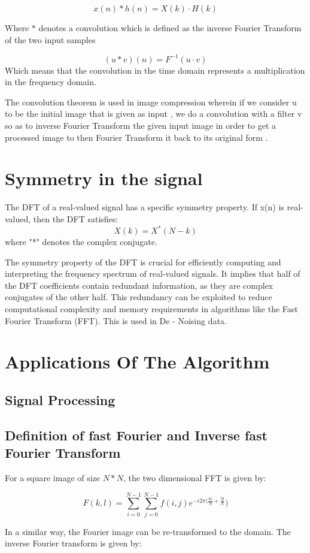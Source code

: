 \documentclass[11pt]{amsart}
\theoremstyle{definition}
\theoremstyle{remark}
\numberwithin{equation}{section}
\begin{document}
\[x(n) \ast h(n)  = X(k) \cdot H(k)\]

Where $\ast$ denotes a convolution which is defined as the inverse Fourier Transform of the two input samples 

\[(u \ast v)(n) = \textit{F}^{-1} (u \cdot v)\]
Which means that the convolution in the time domain represents a multiplication in the frequency domain.

The convolution theorem is used in image compression wherein if we consider u to be the initial image that is given as input , we do a convolution with a filter v so as to inverse Fourier Transform the given input image in order to get a processed image to then Fourier Transform it back to its original form . 

\section{Symmetry in the signal}
The DFT of a real-valued signal has a specific symmetry property. If x(n) is real-valued, then the DFT satisfies:
\[X(k) = X^{*}(N - k)\]
where "*" denotes the complex conjugate.

The symmetry property of the DFT is crucial for efficiently computing and interpreting the frequency spectrum of real-valued signals. It implies that half of the DFT coefficients contain redundant information, as they are complex conjugates of the other half. This redundancy can be exploited to reduce computational complexity and memory requirements in algorithms like the Fast Fourier Transform (FFT). This is used in De - Noising data.

\section{Applications Of The Algorithm}
\subsection{Signal Processing}
\subsection {Definition of fast Fourier and Inverse fast Fourier Transform}

For a square image of size $N*N$, the two dimensional FFT is given by:


\[
F(k,l) = \sum_{i=0}^{N-1} \sum_{j =0}^{N-1} f(i,j) e^{-i2\pi(\frac{ki}{N} +\frac{lg}{N}})
\]

In a similar way, the Fourier image can be re-transformed to the domain. The inverse Fourier transform is given by:
\end{document}
